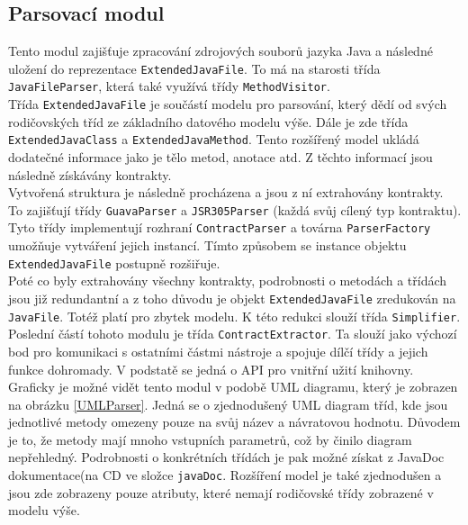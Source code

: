 				

		\subsection{Parsovací modul}
			Tento modul zajišťuje zpracování zdrojových souborů jazyka Java a následné uložení do reprezentace \texttt{ExtendedJavaFile}. To má na starosti třída \texttt{JavaFileParser}, která také využívá třídy \texttt{MethodVisitor}.\\
			
			Třída \texttt{ExtendedJavaFile} je součástí modelu pro parsování, který dědí od svých rodičovských tříd ze základního datového modelu výše. Dále je zde třída \texttt{ExtendedJavaClass} a \texttt{ExtendedJavaMethod}. Tento rozšířený model ukládá dodatečné informace jako je tělo metod, anotace atd. Z těchto informací jsou následně získávány kontrakty.\\
			
			Vytvořená struktura je následně procházena a jsou z ní extrahovány kontrakty. To zajišťují třídy \texttt{GuavaParser} a \texttt{JSR305Parser} (každá svůj cílený typ kontraktu). Tyto třídy implementují rozhraní \texttt{ContractParser} a továrna \texttt{ParserFactory} umožňuje vytváření jejich instancí. Tímto způsobem se instance objektu \texttt{ExtendedJavaFile} postupně rozšiřuje.\\
			
			Poté co byly extrahovány všechny kontrakty, podrobnosti o metodách a třídách jsou již redundantní a z toho důvodu je objekt \texttt{ExtendedJavaFile} zredukován na \texttt{JavaFile}. Totéž platí pro zbytek modelu. K této redukci slouží třída \texttt{Simplifier}.\\
			
			Poslední částí tohoto modulu je třída \texttt{ContractExtractor}. Ta slouží jako výchozí bod pro komunikaci s ostatními částmi nástroje a spojuje dílčí třídy a jejich funkce dohromady. V podstatě se jedná o API pro vnitřní užití knihovny.\\
			
			Graficky je možné vidět tento modul v podobě UML diagramu, který je zobrazen na obrázku \ref{UMLParser}. Jedná se o zjednodušený UML diagram tříd, kde jsou jednotlivé metody omezeny pouze na svůj název a návratovou hodnotu. Důvodem je to, že metody mají mnoho vstupních parametrů, což by činilo diagram nepřehledný. Podrobnosti o konkrétních třídách je pak možné získat z JavaDoc dokumentace(na CD ve složce \texttt{javaDoc}. Rozšíření model je také zjednodušen a jsou zde zobrazeny pouze atributy, které nemají rodičovské třídy zobrazené v modelu výše.
		
